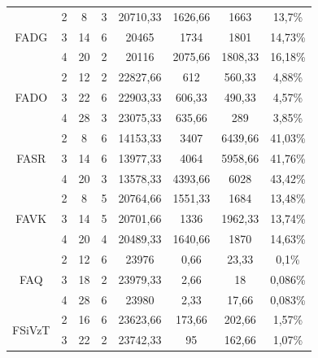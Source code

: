\begin{table}[!htb]
\begin{tabular}{|c|c|c|c|c|c|c|c|}
\multirow{3}{*}{FADG} &
\cellcolor[gray]{0.85}2 & 
\cellcolor[gray]{0.85}8 & 
\cellcolor[gray]{0.85}3 & 
\cellcolor[gray]{0.85}20710,33 & 
\cellcolor[gray]{0.85}1626,66 & 
\cellcolor[gray]{0.85}1663 & 
\cellcolor[gray]{0.85}13,7\%\\
\hhline{~-------}
& 3 & 14 & 6 & 20465 & 1734 & 1801 & 14,73\%\\
\cline{2-8}
& 4 & 20 & 2 & 20116 & 2075,66 & 1808,33 & 16,18\%\\
\hline
\multirow{3}{*}{FADO} & 2 & 12 & 2 & 22827,66 & 612 & 560,33 & 4,88\%\\
\cline{2-8}
& 3 & 22 & 6 & 22903,33 & 606,33 & 490,33 & 4,57\%\\
\hhline{~-------}
& 
\cellcolor[gray]{0.85}4 & 
\cellcolor[gray]{0.85}28 & 
\cellcolor[gray]{0.85}3 & 
\cellcolor[gray]{0.85}23075,33 & 
\cellcolor[gray]{0.85}635,66 & 
\cellcolor[gray]{0.85}289 & 
\cellcolor[gray]{0.85}3,85\%\\
\hline
\multirow{3}{*}{FASR} &
\cellcolor[gray]{0.85}2 & 
\cellcolor[gray]{0.85}8 & 
\cellcolor[gray]{0.85}6 & 
\cellcolor[gray]{0.85}14153,33 & 
\cellcolor[gray]{0.85}3407 & 
\cellcolor[gray]{0.85}6439,66 & 
\cellcolor[gray]{0.85}41,03\%\\
\hhline{~-------}
& 3 & 14 & 6 & 13977,33 & 4064 & 5958,66 & 41,76\%\\
\cline{2-8}
& 4 & 20 & 3 & 13578,33 & 4393,66 & 6028 & 43,42\%\\
\hline
\multirow{3}{*}{FAVK} &
\cellcolor[gray]{0.85}2 & 
\cellcolor[gray]{0.85}8 & 
\cellcolor[gray]{0.85}5 & 
\cellcolor[gray]{0.85}20764,66 & 
\cellcolor[gray]{0.85}1551,33 & 
\cellcolor[gray]{0.85}1684 & 
\cellcolor[gray]{0.85}13,48\%\\
\hhline{~-------}
& 3 & 14 & 5 & 20701,66 & 1336 & 1962,33 & 13,74\%\\
\cline{2-8}
& 4 & 20 & 4 & 20489,33 & 1640,66 & 1870 & 14,63\%\\
\hline
\multirow{3}{*}{FAQ} &
2 & 12 & 6 & 23976 & 0,66 & 23,33 & 0,1\%\\
\cline{2-8}
& 3 & 18 & 2 & 23979,33 & 2,66 & 18 & 0,086\%\\
\hhline{~-------}
& 
\cellcolor[gray]{0.85}4 & 
\cellcolor[gray]{0.85}28 & 
\cellcolor[gray]{0.85}6 & 
\cellcolor[gray]{0.85}23980 & 
\cellcolor[gray]{0.85}2,33 & 
\cellcolor[gray]{0.85}17,66 & 
\cellcolor[gray]{0.85}0,083\%\\
\hline
\multirow{3}{*}{FSiVzT} &
2 & 16 & 6 & 23623,66 & 173,66 & 202,66 & 1,57\%\\
\cline{2-8}
& 3 & 22 & 2 & 23742,33 & 95 & 162,66 & 1,07\%\\

\end{tabular}
\end{table}

